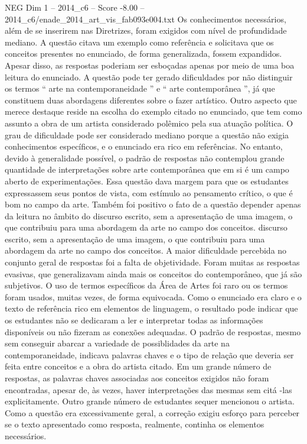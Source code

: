 \begin{textsample}{NEG Dim 1 – 2014\_c6 – Score -8.00 – 2014\_c6/enade\_2014\_art\_vis\_fab093e004.txt}
Os conhecimentos necessários, além de se inserirem nas Diretrizes, foram exigidos com nível de profundidade mediano.
A questão citava um exemplo como referência e solicitava que os conceitos presentes no enunciado, de forma generalizada, fossem expandidos.
Apesar disso, as respostas poderiam ser esboçadas apenas por meio de uma boa leitura do enunciado.
A questão pode ter gerado dificuldades por não distinguir os termos “ arte na contemporaneidade ” e “ arte contemporânea ”, já que constituem duas abordagens diferentes sobre o fazer artístico.
Outro aspecto que merece destaque reside na escolha do exemplo citado no enunciado, que tem como assunto a obra de um artista considerado polêmico pela sua atuação política.
O grau de dificuldade pode ser considerado mediano porque a questão não exigia conhecimentos específicos, e o enunciado era rico em referências.
No entanto, devido à generalidade possível, o padrão de respostas não contemplou grande quantidade de interpretações sobre arte contemporânea que em si é um campo aberto de experimentações.
Essa questão dava margem para que os estudantes expressassem seus pontos de vista, com estímulo ao pensamento crítico, o que é bom no campo da arte.
Também foi positivo o fato de a questão depender apenas da leitura no âmbito do discurso escrito, sem a apresentação de uma imagem, o que contribuiu para uma abordagem da arte no campo dos conceitos. discurso escrito, sem a apresentação de uma imagem, o que contribuiu para uma abordagem da arte no campo dos conceitos.
A maior dificuldade percebida no conjunto geral de respostas foi a falta de objetividade.
Foram muitas as respostas evasivas, que generalizavam ainda mais os conceitos do contemporâneo, que já são subjetivos.
O uso de termos específicos da Área de Artes foi raro ou os termos foram usados, muitas vezes, de forma equivocada.
Como o enunciado era claro e o texto de referência rico em elementos de linguagem, o resultado pode indicar que os estudantes não se dedicaram a ler e interpretar todas as informações disponíveis ou não fizeram as conexões adequadas.
O padrão de respostas, mesmo sem conseguir abarcar a variedade de possiblidades da arte na contemporaneidade, indicava palavras chaves e o tipo de relação que deveria ser feita entre conceitos e a obra do artista citado.
Em um grande número de respostas, as palavras chaves associadas aos conceitos exigidos não foram encontradas, apesar de, às vezes, haver interpretações das mesmas sem citá -las explicitamente.
Outro grande número de estudantes sequer mencionou o artista.
Como a questão era excessivamente geral, a correção exigiu esforço para perceber se o texto apresentado como resposta, realmente, continha os elementos necessários.

\end{textsample}
